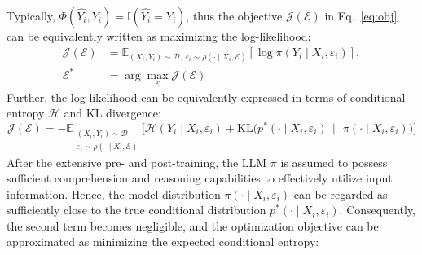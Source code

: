 Typically, $\Phi(\hat{Y_i},Y_i) = \mathbb{I}(\hat{Y_i}\!=\!Y_i)$, thus the objective $\mathcal{J}(\mathcal{E})$ in Eq.~\ref{eq:obj} can be equivalently written as maximizing the log-likelihood:
\begin{equation}
\begin{aligned}
\mathcal{J}(\mathcal{E}) 
&= \mathbb{E}_{(X_i,Y_i)\sim\mathcal{D},\ \varepsilon_i\sim\rho(\cdot\mid X_i,\mathcal{E})}
\left[\log \pi(Y_i\mid X_i,\varepsilon_i)\right], \\[3pt]
\mathcal{E}^* 
&= \arg\max_{\mathcal{E}}\mathcal{J}(\mathcal{E})
\end{aligned}
\label{eq:objective}
\end{equation}
Further, the log-likelihood can be equivalently expressed in terms of conditional entropy $\mathcal{H}$ and KL divergence:
\begin{equation}
\mathcal{J}(\mathcal{E}) = 
-\mathbb{E}_{\substack{(X_i,Y_i)\sim\mathcal{D} \\ \varepsilon_i\sim\rho(\cdot\mid X_i,\mathcal{E})}}
\Big[\mathcal{H}(Y_i\mid X_i,\varepsilon_i) + 
\mathrm{KL}\big(p^*(\cdot\mid X_i,\varepsilon_i)\,\|\,\pi(\cdot\mid X_i,\varepsilon_i)\big)\Big]
\end{equation}
After the extensive pre- and post-training, the LLM $\pi$ is assumed to possess sufficient comprehension and reasoning capabilities to effectively utilize input information. 
Hence, the model distribution $\pi(\cdot\mid X_i,\varepsilon_i)$ can be regarded as sufficiently close to the true conditional distribution $p^*(\cdot\mid X_i,\varepsilon_i)$. 
Consequently, the second term becomes negligible, and the optimization objective can be approximated as minimizing the expected conditional entropy:

